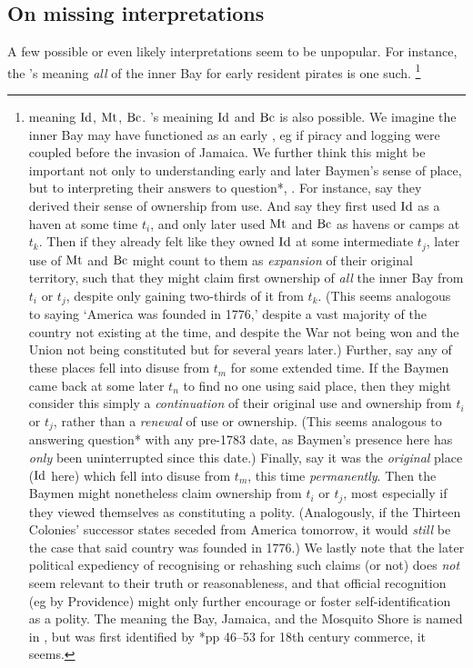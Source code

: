 	\subsection{On missing interpretations}
	\label{ss:onmissinginterpret}
		A few possible or even likely interpretations seem to be unpopular. For instance, the 's meaning \emph{all} of the inner Bay for early resident pirates is one such.%
		\footnote{ meaning \(\operatorname{Id}\), \(\operatorname{Mt}\), \(\operatorname{Bc}\). 's meaining \(\operatorname{Id}\) and \(\operatorname{Bc}\) is also possible. We imagine the inner Bay may have functioned as an early , eg if piracy and logging were coupled before the invasion of Jamaica. We further think this might be important not only to understanding early and later Baymen's sense of place, but to interpreting their answers to question*, . For instance, say they derived their sense of ownership from use. And say they first used \(\operatorname{Id}\) as a haven at some time \(t_i\), and only later used \(\operatorname{Mt}\) and \(\operatorname{Bc}\) as havens or camps at \(t_k\). Then if they already felt like they owned \(\operatorname{Id}\) at some intermediate \(t_j\), later use of \(\operatorname{Mt}\) and \(\operatorname{Bc}\) might count to them as \emph{expansion} of their original territory, such that they might claim first ownership of \emph{all} the inner Bay from \(t_i\) or \(t_j\), despite only gaining two-thirds of it from \(t_k\). (This seems analogous to saying `America was founded in 1776,' despite a vast majority of the country not existing at the time, and despite the War not being won and the Union not being constituted but for several years later.) Further, say any of these places fell into disuse from \(t_m\) for some extended time. If the Baymen came back at some later \(t_n\) to find no one using said place, then they might consider this simply a \emph{continuation} of their original use and ownership from \(t_i\) or \(t_j\), rather than a \emph{renewal} of use or ownership. (This seems analogous to answering question* with any pre-1783 date, as Baymen's presence here has \emph{only} been uninterrupted since this date.) Finally, say it was the \emph{original} place (\(\operatorname{Id}\) here) which fell into disuse from \(t_m\), this time \emph{permanently}. Then the Baymen might nonetheless claim ownership from \(t_i\) or \(t_j\), most especially if they viewed themselves as constituting a polity. (Analogously, if the Thirteen Colonies' successor states seceded from America tomorrow, it would \emph{still} be the case that said country was founded in 1776.) We lastly note that the later political expediency of recognising or rehashing such claims (or not) does \emph{not} seem relevant to their truth or reasonableness, and that official recognition (eg by Providence) might only further encourage or foster self-identification as a polity. The  meaning the Bay, Jamaica, and the Mosquito Shore is named in , but was first identified by \cite{nay89}*{pp 46--53} for 18th century commerce, it seems.} %
